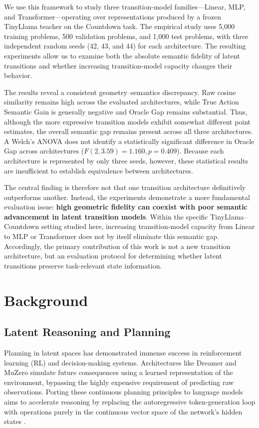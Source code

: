 \documentclass[conference]{IEEEtran}
\begin{document}
We use this framework to study three transition-model families---Linear, MLP, and Transformer---operating over representations produced by a frozen TinyLlama teacher on the Countdown task. The empirical study uses 5,000 training problems, 500 validation problems, and 1,000 test problems, with three independent random seeds (42, 43, and 44) for each architecture. The resulting experiments allow us to examine both the absolute semantic fidelity of latent transitions and whether increasing transition-model capacity changes their behavior.

The results reveal a consistent geometry--semantics discrepancy. Raw cosine similarity remains high across the evaluated architectures, while True Action Semantic Gain is generally negative and Oracle Gap remains substantial. Thus, although the more expressive transition models exhibit somewhat different point estimates, the overall semantic gap remains present across all three architectures. A Welch's ANOVA does not identify a statistically significant difference in Oracle Gap across architectures ($F(2,3.59)=1.160, p=0.409$). Because each architecture is represented by only three seeds, however, these statistical results are insufficient to establish equivalence between architectures.

The central finding is therefore not that one transition architecture definitively outperforms another. Instead, the experiments demonstrate a more fundamental evaluation issue: \textbf{high geometric fidelity can coexist with poor semantic advancement in latent transition models}. Within the specific TinyLlama--Countdown setting studied here, increasing transition-model capacity from Linear to MLP or Transformer does not by itself eliminate this semantic gap. Accordingly, the primary contribution of this work is not a new transition architecture, but an evaluation protocol for determining whether latent transitions preserve task-relevant state information.

\section{Background}

\subsection{Latent Reasoning and Planning}
Planning in latent spaces has demonstrated immense success in reinforcement learning (RL) and decision-making systems. Architectures like Dreamer \cite{hafner2020dream} and MuZero \cite{schrittwieser2020mastering} simulate future consequences using a learned representation of the environment, bypassing the highly expensive requirement of predicting raw observations. Porting these continuous planning principles to language models aims to accelerate reasoning by replacing the autoregressive token-generation loop with operations purely in the continuous vector space of the network's hidden states \cite{belrose2023eliciting}.
\end{document}
